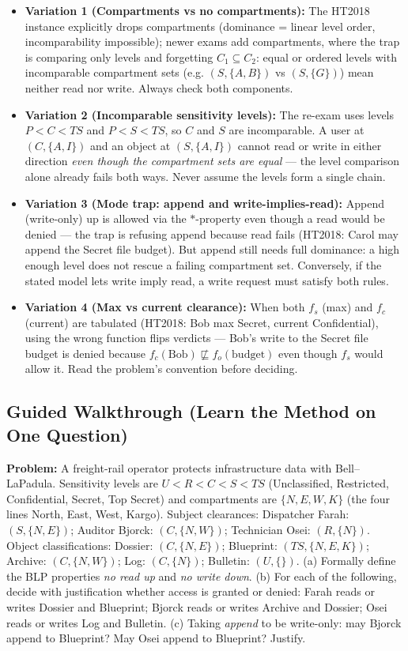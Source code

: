 \documentclass[12pt, a4paper]{article}
\begin{document}
\begin{trapbox}
\begin{itemize}
    \item \textbf{Variation 1 (Compartments vs no compartments):} The HT2018 instance explicitly drops compartments (dominance = linear level order, incomparability impossible); newer exams add compartments, where the trap is comparing only levels and forgetting $C_1 \subseteq C_2$: equal or ordered levels with incomparable compartment sets (e.g. $(S, \{A,B\})$ vs $(S, \{G\})$) mean neither read nor write. Always check both components.
    \item \textbf{Variation 2 (Incomparable sensitivity levels):} The re-exam uses levels $P < C < TS$ and $P < S < TS$, so $C$ and $S$ are incomparable. A user at $(C, \{A,I\})$ and an object at $(S, \{A,I\})$ cannot read or write in either direction \emph{even though the compartment sets are equal} --- the level comparison alone already fails both ways. Never assume the levels form a single chain.
    \item \textbf{Variation 3 (Mode trap: append and write-implies-read):} Append (write-only) up is allowed via the $*$-property even though a read would be denied --- the trap is refusing append because read fails (HT2018: Carol may append the Secret file budget). But append still needs full dominance: a high enough level does not rescue a failing compartment set. Conversely, if the stated model lets write imply read, a write request must satisfy both rules.
    \item \textbf{Variation 4 (Max vs current clearance):} When both $f_s$ (max) and $f_c$ (current) are tabulated (HT2018: Bob max Secret, current Confidential), using the wrong function flips verdicts --- Bob's write to the Secret file budget is denied because $f_c(\text{Bob}) \not\sqsubseteq f_o(\text{budget})$ even though $f_s$ would allow it. Read the problem's convention before deciding.
\end{itemize}
\end{trapbox}

\subsection*{Guided Walkthrough (Learn the Method on One Question)}
\textbf{Problem:} A freight-rail operator protects infrastructure data with Bell--LaPadula. Sensitivity levels are $U < R < C < S < TS$ (Unclassified, Restricted, Confidential, Secret, Top Secret) and compartments are $\{N, E, W, K\}$ (the four lines North, East, West, Kargo). Subject clearances: Dispatcher Farah: $(S, \{N, E\})$; Auditor Bjorck: $(C, \{N, W\})$; Technician Osei: $(R, \{N\})$. Object classifications: Dossier: $(C, \{N, E\})$; Blueprint: $(TS, \{N, E, K\})$; Archive: $(C, \{N, W\})$; Log: $(C, \{N\})$; Bulletin: $(U, \{\})$. (a) Formally define the BLP properties \emph{no read up} and \emph{no write down}. (b) For each of the following, decide with justification whether access is granted or denied: Farah reads or writes Dossier and Blueprint; Bjorck reads or writes Archive and Dossier; Osei reads or writes Log and Bulletin. (c) Taking \emph{append} to be write-only: may Bjorck append to Blueprint? May Osei append to Blueprint? Justify.
\end{document}
